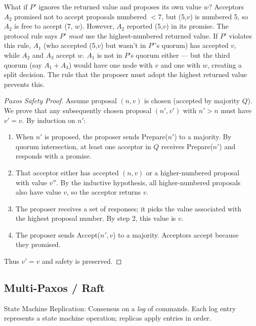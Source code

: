 \begin{example}
What if $P'$ ignores the returned value and proposes its own value $w$? Acceptors $A_2$ promised not to accept proposals numbered $< 7$, but (5,$v$) is numbered 5, so $A_2$ is free to accept (7, $w$). However, $A_2$ reported (5,$v$) in its promise. The protocol rule says $P'$ \emph{must} use the highest-numbered returned value. If $P'$ violates this rule, $A_1$ (who accepted (5,$v$) but wasn't in $P'$'s quorum) has accepted $v$, while $A_2$ and $A_3$ accept $w$. $A_1$ is not in $P$'s quorum either — but the third quorum (say $A_1 + A_3$) would have one node with $v$ and one with $w$, creating a split decision. The rule that the proposer must adopt the highest returned value prevents this.
\end{example}

\begin{proof}[Paxos Safety Proof]
Assume proposal $(n, v)$ is chosen (accepted by majority $Q$). We prove that any subsequently chosen proposal $(n', v')$ with $n' > n$ must have $v' = v$. By induction on $n'$:
\begin{enumerate}
\item When $n'$ is proposed, the proposer sends Prepare($n'$) to a majority. By quorum intersection, at least one acceptor in $Q$ receives Prepare($n'$) and responds with a promise.
\item That acceptor either has accepted $(n, v)$ or a higher-numbered proposal with value $v''$. By the inductive hypothesis, all higher-numbered proposals also have value $v$, so the acceptor returns $v$.
\item The proposer receives a set of responses; it picks the value associated with the highest proposal number. By step 2, this value is $v$.
\item The proposer sends Accept($n', v$) to a majority. Acceptors accept because they promised.
\end{enumerate}
Thus $v' = v$ and safety is preserved.
\end{proof}

\subsection{Multi-Paxos / Raft}
\label{sec:consensus:raft}

State Machine Replication: Consensus on a \emph{log} of commands. Each log entry represents a state machine operation; replicas apply entries in order.

